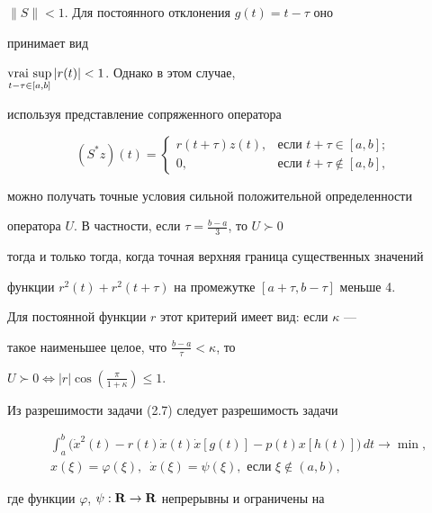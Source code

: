 \begin{exam}
$\|S\|<1$. Для постоянного отклонения $g(t)=t-\tau$ оно


принимает вид


$\vraisup\limits_{t-\tau\in[a,b]}|r(t)|<1$. Однако в этом случае,


используя представление сопряженного оператора


$$


(S^*z)(t)=


\begin{cases}


r(t+\tau)z(t),&\text{если }t+\tau\in [a,b];\\


0,& \text{если }t+\tau\notin[a,b],


\end{cases}


$$


можно получать точные условия сильной положительной определенности


оператора $U$. В частности, если $\tau=\frac{b-a}3$, то $U\succ0$


тогда и только тогда, когда точная верхняя граница существенных значений


функции $r^2(t)+r^2(t+\tau)$ на промежутке $[a+\tau,b-\tau]$ меньше 4.


Для постоянной функции $r$ этот критерий имеет вид: если $\kappa$ ---


такое наименьшее целое, что $\frac{b-a}{\tau}<\kappa$, то


$U\succ0\Longleftrightarrow|r|\cos(\frac\pi{1+\kappa})\le1$.





Из разрешимости задачи (2.7) следует разрешимость задачи


\begin{equation}


\begin{split}


&\int_a^b\big(\Dot x^2(t)-r(t)\Dot


x(t)\Dot x[g(t)]-p(t)x[h(t)]\big)\,dt\longrightarrow\min,\\


&x(\xi)=\varphi(\xi),\ \;\Dot x(\xi)=\psi(\xi),\text{ если }\xi\notin(a,b),


\end{split}


\end{equation}


где функции $\varphi$, $\psi:\bold R{}\to\bold R{}$ непрерывны и ограничены на



\end{exam}
